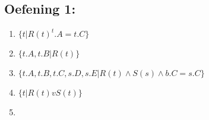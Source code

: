 \documentclass[../Oefenzitting5.tex]{subfiles}
\begin{document}
  \subsection{Oefening 1:}
    \begin{enumerate}
      \item

        $
          \{ t | R(t) ^ t.A = t.C \}
        $
      \item
        $
          \{ t.A, t.B | R(t) \}
        $
      \item
        $
          \{ t.A, t.B, t.C, s.D, s.E | R(t) \wedge S(s) \wedge b.C = s.C \}
        $
      \item
        $
          \{ t | R(t) v S(t)  \}
        $
      \item
        $

        $


    \end{enumerate}
\end{document}
